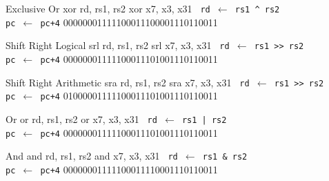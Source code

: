 \TDrawInsnTypeRPicture
{Exclusive Or}
{xor rd, rs1, rs2}
{xor x7, x3, x31}
{\tt%
rd $\leftarrow$ rs1 \^{} rs2\\
pc $\leftarrow$ pc+4}
{00000001111100011100001110110011}

\TDrawInsnTypeRPicture
{Shift Right Logical}
{srl rd, rs1, rs2}
{srl x7, x3, x31}
{\tt%
rd $\leftarrow$ rs1 >> rs2\\
pc $\leftarrow$ pc+4}
{00000001111100011101001110110011}

\TDrawInsnTypeRPicture
{Shift Right Arithmetic}
{sra rd, rs1, rs2}
{sra x7, x3, x31}
{\tt%
rd $\leftarrow$ rs1 >> rs2\\
pc $\leftarrow$ pc+4}
{01000001111100011101001110110011}

\TDrawInsnTypeRPicture
{Or}
{or rd, rs1, rs2}
{or x7, x3, x31}
{\tt%
rd $\leftarrow$ rs1 | rs2\\
pc $\leftarrow$ pc+4}
{00000001111100011101001110110011}

\TDrawInsnTypeRPicture
{And}
{and rd, rs1, rs2}
{and x7, x3, x31}
{\tt%
rd $\leftarrow$ rs1 \& rs2\\
pc $\leftarrow$ pc+4}
{00000001111100011110001110110011}


